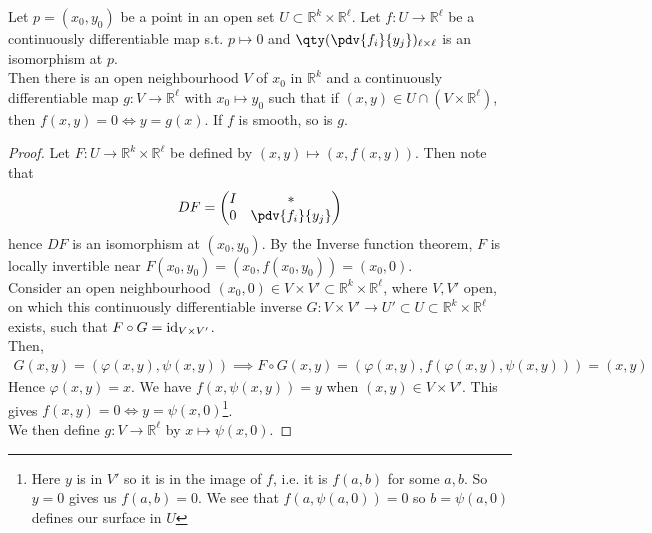 \begin{theorem}
	Let $p = (x_0, y_0)$ be a point in an open set $U \subset \mathbb R^k \times \mathbb R^\ell$.
	Let $f \colon U \to \mathbb R^\ell$ be a continuously differentiable map s.t. $p \mapsto 0$ and $\qty(\pdv{f_i}{y_j})_{\ell \times \ell}$ is an isomorphism at $p$. \\
	Then there is an open neighbourhood $V$ of $x_0$ in $\mathbb R^k$ and a continuously differentiable map $g \colon V \to \mathbb R^\ell$ with $x_0 \mapsto y_0$ such that if $(x,y) \in U \cap (V \times \mathbb R^\ell)$, then $f(x,y)=0\iff y=g(x)$.
	If $f$ is smooth, so is $g$.
\end{theorem}

\begin{proof}
	Let $F \colon U \to \mathbb R^k \times \mathbb R^\ell$ be defined by $(x,y) \mapsto (x,f(x,y))$.
	Then note that
	\begin{align*}
		DF = \begin{pmatrix}
			I & \ast           \\
			0 & \pdv{f_i}{y_j}
		\end{pmatrix}
	\end{align*}
	hence $DF$ is an isomorphism at $(x_0, y_0)$.
	By the Inverse function theorem, $F$ is locally invertible near $F(x_0,y_0) = (x_0,f(x_0,y_0)) = (x_0, 0)$. \\
	Consider an open neighbourhood $(x_0, 0) \in V \times V' \subset \mathbb R^k \times \mathbb R^\ell$, where $V, V'$ open, on which this continuously differentiable inverse $G \colon V \times V' \to U' \subset U \subset \mathbb R^k \times \mathbb R^\ell$ exists, such that $F \circ G = \operatorname{id}_{V \times V'}$. \\
	Then,
	\begin{align*}
		G(x,y) = (\varphi(x,y), \psi(x,y)) \implies F \circ G(x,y) = (\varphi(x,y), f(\varphi(x,y), \psi(x,y))) = (x,y)
	\end{align*}
	Hence $\varphi(x,y) = x$.
	We have $f(x,\psi(x,y)) = y$ when $(x,y) \in V \times V'$.
	This gives $f(x,y) = 0 \iff y = \psi(x,0)$\footnote{Here $y$ is in $V'$ so it is in the image of $f$, i.e. it is $f(a, b)$ for some $a, b$. So $y = 0$ gives us $f(a, b) = 0$. We see that $f(a, \psi(a, 0)) = 0$ so $b = \psi(a, 0)$ defines our surface in $U$}. \\
	We then define $g \colon V \to \mathbb R^\ell$ by $x \mapsto \psi(x,0)$.
\end{proof}

